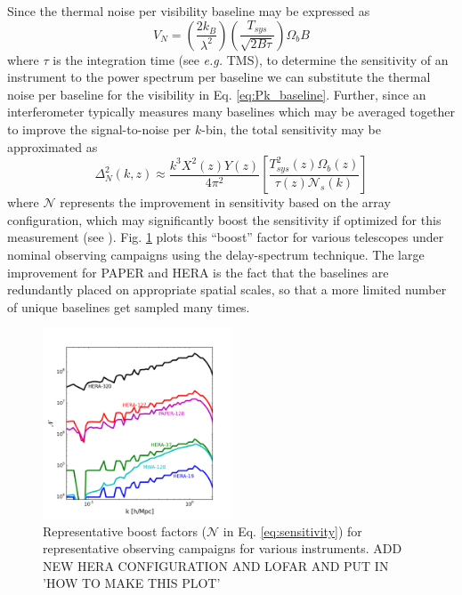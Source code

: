 \documentclass[preprint,11pt]{aastex}
\begin{document}
Since the thermal noise per visibility baseline may be expressed as
\begin{equation}
V_N = \left(\frac{2k_B}{\lambda^2}\right)\left(\frac{T_{sys}}{\sqrt{2B\tau}}\right)\Omega_b B
\label{eq:sensitivity_per_baseline}
\end{equation}
where $\tau$ is the integration time (see {\em e.g.} TMS),
to determine the sensitivity of an instrument to the power spectrum per baseline we can substitute the thermal noise per baseline for the visibility in Eq. \ref{eq:Pk_baseline}.  Further, since an interferometer typically measures many baselines which may be averaged together to improve the signal-to-noise per $k$-bin, the total sensitivity may be approximated as
\begin{equation}
\Delta^2_N (k,z)\approx \frac{k^3X^2(z)Y(z)}{4\pi^2} \left[\frac{T_{sys}^2(z)\Omega_b(z) }{\tau(z) \mathcal{N}_s(k)}\right]
\label{eq:sensitivity}
\end{equation}
where $\mathcal{N}$ represents the improvement in sensitivity based on the array configuration, which may significantly boost the sensitivity if optimized for this measurement 
(see \cite{parsons_et_al2012b}).  Fig. \ref{fig:boost} plots this ``boost'' factor for various telescopes under nominal observing campaigns using the delay-spectrum technique.  The large improvement for PAPER and HERA is the fact that the baselines are redundantly placed on appropriate spatial scales, so that a more limited number of unique baselines get sampled many times.



\begin{figure}[h!]
\includegraphics[width=0.5\textwidth]{plots/boost.png}
\caption{Representative boost factors ($\mathcal{N}$ in Eq. \ref{eq:sensitivity}) for representative observing campaigns for various instruments.
ADD NEW HERA CONFIGURATION AND LOFAR AND PUT IN 'HOW TO MAKE THIS PLOT'}
\label{fig:boost}
\end{figure}
\end{document}
